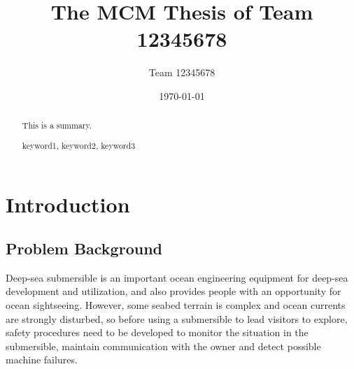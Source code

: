 \documentclass{mcmthesis}  %
\title{The MCM Thesis of Team 12345678}  %
\author{\small Team 12345678}  %
\date{\today}  %
\begin{document}
\begin{abstract}  %
This is a summary.
\begin{keywords}  %
keyword1, keyword2, keyword3
\end{keywords}  %
\end{abstract}  %
\maketitle  %

\tableofcontents  %


\newpage  %
\section{Introduction}  %
\subsection{Problem Background}  %

Deep-sea submersible is an important ocean engineering equipment for deep-sea development and utilization, and also provides people with an opportunity for ocean sightseeing. However, some seabed terrain is complex and ocean currents are strongly disturbed\cite{KJRB202306260042}, so before using a submersible to lead visitors to explore, safety procedures need to be developed to monitor the situation in the submersible, maintain communication with the owner and detect possible machine failures.
\end{document}
